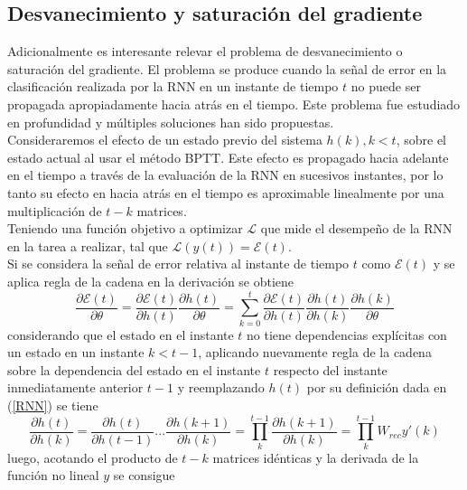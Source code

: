\documentclass{article}
\begin{document}
	\subsection{Desvanecimiento y saturación del gradiente}
	Adicionalmente es interesante relevar el problema de desvanecimiento o saturación del gradiente. El problema se produce cuando la señal de error en la clasificación realizada por la RNN en un instante de tiempo $t$ no puede ser propagada apropiadamente hacia atrás en el tiempo. Este problema fue estudiado en profundidad y múltiples soluciones han sido propuestas\cite{24LongTermDependenciesBengio, 10Pascanu}.\\ 
	Consideraremos el efecto de un estado previo del sistema $h(k), k<t$, sobre el estado actual al usar el método BPTT. Este efecto es propagado hacia adelante en el tiempo a través de la evaluación de la RNN en sucesivos instantes, por lo tanto su efecto en hacia atrás en el tiempo es aproximable linealmente por una multiplicación de $t-k$ matrices\cite{23BifurcationsDoya}.\\
	Teniendo una función objetivo a optimizar $\mathcal{L}$ que mide el desempeño de la RNN en la tarea a realizar, tal que $\mathcal{L}(y(t)) = \mathcal{E}(t)$. \\
	Si se considera la señal de error relativa al instante de tiempo $t$ como $\mathcal{E}(t)$ y se aplica regla de la cadena en la derivación se obtiene
	\begin{equation*}
	\dfrac{\partial \mathcal{E}(t)}{\partial \theta} = \dfrac{\partial \mathcal{E}(t)}{\partial h(t)} \dfrac{\partial h(t)}{\partial \theta} =\sum_{k=0}^{t} \dfrac{\partial \mathcal{E}(t)}{\partial h(t)} \dfrac{\partial h(t)}{\partial h(k)}\dfrac{\partial h(k)}{\partial \theta}
	\end{equation*}
	considerando que el estado en el instante $t$ no tiene dependencias explícitas con un estado en un instante $k < t-1$, aplicando nuevamente regla de la cadena sobre la dependencia del estado en el instante $t$ respecto del instante inmediatamente anterior $t-1$ y reemplazando $h(t)$ por su definición dada en (\ref{RNN}) se tiene
	\begin{equation*}
	\dfrac{\partial h(t)}{\partial h(k)} = \dfrac{\partial h(t)}{\partial h(t-1)} ... \dfrac{\partial h(k+1)}{\partial h(k)} = \prod_{k}^{t-1} \dfrac{\partial h(k+1)}{\partial h(k)} = \prod_{k}^{t-1} W_{rec} y'(k)
	\end{equation*}
	luego, acotando el producto de $t-k$ matrices idénticas y la derivada de la función no lineal $y$ se consigue
\end{document}
